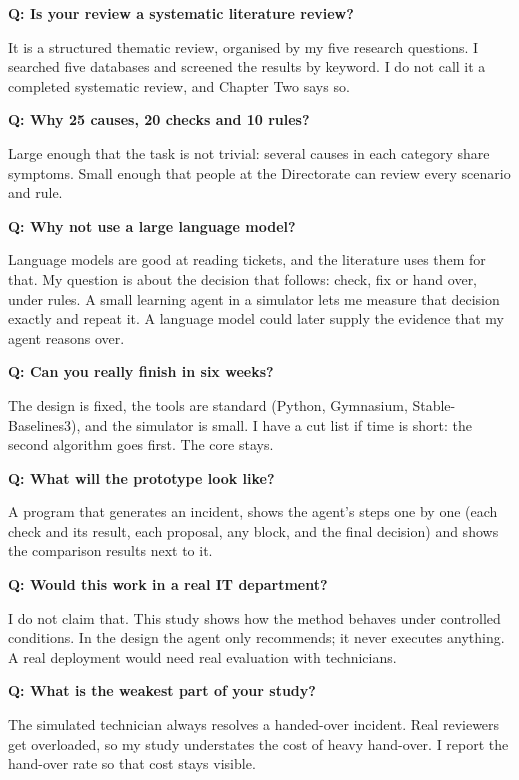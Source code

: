 \documentclass[10pt,a4paper]{article}
\newcommand{\sect}[1]{\par\vspace{9pt}{\bfseries\color{accent}\fontsize{13}{15}\selectfont #1}\par\vspace{-3pt}{\color{accent}\hrule height 0.8pt}\vspace{5pt}}
\newcommand{\qa}[2]{\par\vspace{3pt}\textbf{Q: #1}\par\vspace{-1pt}#2\par}
\begin{document}
\qa{Is your review a systematic literature review?}{It is a structured thematic review, organised by my five research questions. I searched five databases and screened the results by keyword. I do not call it a completed systematic review, and Chapter Two says so.}

\qa{Why 25 causes, 20 checks and 10 rules?}{Large enough that the task is not trivial: several causes in each category share symptoms. Small enough that people at the Directorate can review every scenario and rule.}

\qa{Why not use a large language model?}{Language models are good at reading tickets, and the literature uses them for that. My question is about the decision that follows: check, fix or hand over, under rules. A small learning agent in a simulator lets me measure that decision exactly and repeat it. A language model could later supply the evidence that my agent reasons over.}

\qa{Can you really finish in six weeks?}{The design is fixed, the tools are standard (Python, Gymnasium, Stable-Baselines3), and the simulator is small. I have a cut list if time is short: the second algorithm goes first. The core stays.}

\qa{What will the prototype look like?}{A program that generates an incident, shows the agent's steps one by one (each check and its result, each proposal, any block, and the final decision) and shows the comparison results next to it.}

\qa{Would this work in a real IT department?}{I do not claim that. This study shows how the method behaves under controlled conditions. In the design the agent only recommends; it never executes anything. A real deployment would need real evaluation with technicians.}

\qa{What is the weakest part of your study?}{The simulated technician always resolves a handed-over incident. Real reviewers get overloaded, so my study understates the cost of heavy hand-over. I report the hand-over rate so that cost stays visible.}

\sect{6. Numbers to have ready}
\end{document}
